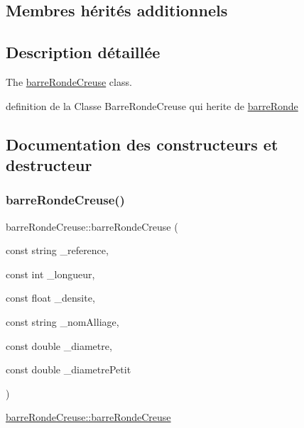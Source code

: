 \subsection*{Membres hérités additionnels}


\subsection{Description détaillée}
The \hyperlink{classbarre_ronde_creuse}{barre\+Ronde\+Creuse} class. 

definition de la Classe Barre\+Ronde\+Creuse qui herite de \hyperlink{classbarre_ronde}{barre\+Ronde} 

\subsection{Documentation des constructeurs et destructeur}
\mbox{\label{classbarre_ronde_creuse_aa3b1bff9d23a8f5740f082684aec2956}} 
\subsubsection{\texorpdfstring{barre\+Ronde\+Creuse()}{barreRondeCreuse()}}
{\footnotesize\ttfamily barre\+Ronde\+Creuse\+::barre\+Ronde\+Creuse (\begin{DoxyParamCaption}\item[{const string}]{\+\_\+reference,  }\item[{const int}]{\+\_\+longueur,  }\item[{const float}]{\+\_\+densite,  }\item[{const string}]{\+\_\+nom\+Alliage,  }\item[{const double}]{\+\_\+diametre,  }\item[{const double}]{\+\_\+diametre\+Petit }\end{DoxyParamCaption})}



\hyperlink{classbarre_ronde_creuse_aa3b1bff9d23a8f5740f082684aec2956}{barre\+Ronde\+Creuse\+::barre\+Ronde\+Creuse} 



